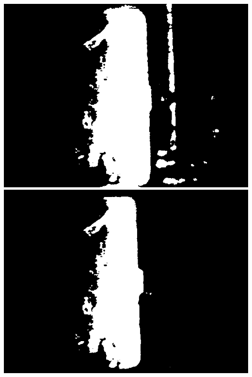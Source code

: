 \documentclass[12pt]{article}
\begin{document}
\newpage
\includegraphics[scale=0.8]{images/volume_image_processing/binary_laser_image.png}
\newpage
\includegraphics[scale=0.8]{images/volume_image_processing/union_laser_led_binaries.png}
\newpage
\end{document}
